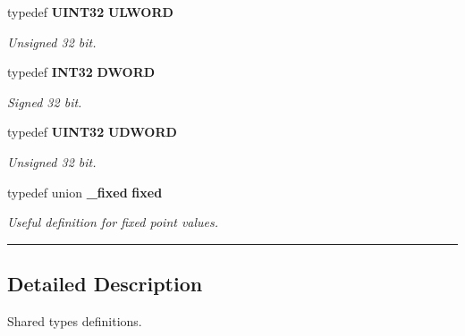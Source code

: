 \begin{CompactItemize}
\item 
\label{asm/types.h_a6}
typedef {\bf UINT32} {\bf ULWORD}
\begin{CompactList}\small\item\em Unsigned 32 bit.\item\end{CompactList}

\item 
\label{asm/types.h_a7}
typedef {\bf INT32} {\bf DWORD}
\begin{CompactList}\small\item\em Signed 32 bit.\item\end{CompactList}

\item 
\label{asm/types.h_a8}
typedef {\bf UINT32} {\bf UDWORD}
\begin{CompactList}\small\item\em Unsigned 32 bit.\item\end{CompactList}

\item 
\label{asm/types.h_a9}
typedef union {\bf \_\-fixed}  {\bf fixed}
\begin{CompactList}\small\item\em Useful definition for fixed point values.\item\end{CompactList}

\end{CompactItemize}
\vspace{0.4cm}\hrule\vspace{0.2cm}
\subsection*{Detailed Description}
Shared types definitions.